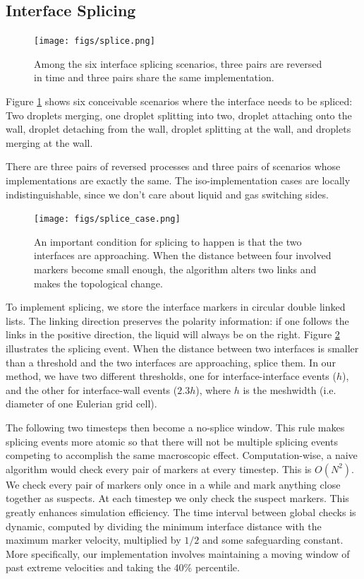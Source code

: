 \documentclass{jfm}
\begin{document}
\subsection{Interface Splicing} \label{subsec:splice}
\begin{figure}
    \centering
    \texttt{[image: figs/splice.png]}
    \caption{
        Among the six interface splicing scenarios, three pairs are reversed in time and three pairs share the same implementation. 
    }
    \label{fig:splice}
\end{figure}
Figure \ref{fig:splice} shows six conceivable scenarios where the interface needs to be spliced: Two droplets merging, one droplet splitting into two, droplet attaching onto the wall, droplet detaching from the wall, droplet splitting at the wall, and droplets merging at the wall. 

There are three pairs of reversed processes and three pairs of scenarios whose implementations are exactly the same. The iso-implementation cases are locally indistinguishable, since we don't care about liquid and gas switching sides. 
\begin{figure}
    \centering
    \texttt{[image: figs/splice\_case.png]}
    \caption{
        An important condition for splicing to happen is that the two interfaces are approaching. When the distance between four involved markers become small enough, the algorithm alters two links and makes the topological change. 
    }
    \label{fig:splice_zoom}
\end{figure}
To implement splicing, we store the interface markers in circular double linked lists. The linking direction preserves the polarity information: if one follows the links in the positive direction, the liquid will always be on the right. Figure \ref{fig:splice_zoom} illustrates the splicing event. When the distance between two interfaces is smaller than a threshold and the two interfaces are approaching, splice them. In our method, we have two different thresholds, one for interface-interface events ($h$), and the other for interface-wall events ($2.3h$), where $h$ is the meshwidth (i.e. diameter of one Eulerian grid cell). 

The following two timesteps then become a no-splice window. This rule makes splicing events more atomic so that there will not be multiple splicing events competing to accomplish the same macroscopic effect. Computation-wise, a naive algorithm would check every pair of markers at every timestep. This is $O(N^2)$. We check every pair of markers only once in a while and mark anything close together as suspects. At each timestep we only check the suspect markers. This greatly enhances simulation efficiency. The time interval between global checks is dynamic, computed by dividing the minimum interface distance with the maximum marker velocity, multiplied by $1/2$ and some safeguarding constant. More specifically, our implementation involves maintaining a moving window of past extreme velocities and taking the 40\% percentile. 
\end{document}

